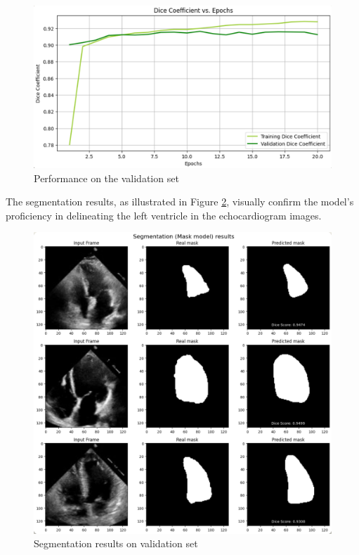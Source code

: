\documentclass[runningheads]{llncs}
\begin{document}
\begin{figure}[H]
    \centering
    \includegraphics[width=1.0\textwidth]{m1.jpg}
    \caption{Performance on the validation set}
    \label{fig:m1}
\end{figure}

The segmentation results, as illustrated in Figure \ref{fig:m1s}, visually confirm the model's proficiency in delineating the left ventricle in the echocardiogram images.

\begin{figure}[H]
    \centering
    \includegraphics[width=1.0\textwidth]{m1s.jpg}
    \caption{Segmentation results on validation set}
    \label{fig:m1s}
\end{figure}
\end{document}
